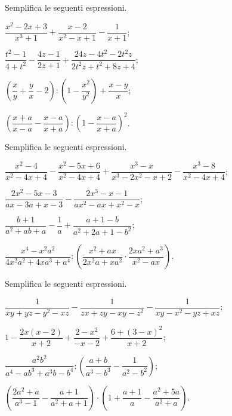 \begin{esercizio}[\Ast]
Semplifica le seguenti espressioni.
\begin{multicols}{2}
\begin{enumeratea}
 \item $\dfrac{x^{{2}}-2x+3}{x^{{3}}+1}+\dfrac{x-2}{x^{{2}}-x+1}-\dfrac{1}{x+1}$;
 \item $\dfrac{t^{2}-1}{4+t^{2}}-\dfrac{4z-1}{2z+1}+\dfrac{24z-4t^{2}-2t^{2}z}{2t^{2}z+t^{2}+8z+4}$;
 \item $\left(\dfrac{x}{y}+\dfrac{y}{x}-2\right):\left(1-\dfrac{x^{2}}{y^{2}}\right)+\dfrac{x-y}{x}$;
 \item $\left(\dfrac{x+a}{x-a}-\dfrac{x-a}{x+a}\right):\left(1-\dfrac{x-a}{x+a}\right)^{2}$.
\end{enumeratea}
\end{multicols}
\end{esercizio}

\begin{esercizio}
Semplifica le seguenti espressioni.
\begin{enumeratea}
 \item $\dfrac{x^{2}-4}{x^{2}-4x+4}-\dfrac{x^{2}-5x+6}{x^{2}-4x+4}+\dfrac{x^{3}-x}{x^{3}-2x^{2}-x+2}-\dfrac{x^{3}-8}{x^{2}-4x+4}$;
 \item $\dfrac{2x^{2}-5x-3}{ax-3a+x-3}-\dfrac{2x^{3}-x-1}{ax^{2}-ax+x^{2}-x}$;
 \item $\dfrac{b+1}{a^{2}+ab+a}-\dfrac{1}{a}+\dfrac{a+1-b}{a^{2}+2a+1-b^{2}}$;
 \item $\dfrac{x^{4}-x^{2}a^{2}}{4x^{2}a^{2}+4xa^{3}+a^{4}}:\left(\dfrac{x^{2}+ax}{2x^{2}a+xa^{2}}\cdot{\dfrac{2xa^{2}+a^{3}}{x^{2}-ax}}\right)$.
\end{enumeratea}
\end{esercizio}

\begin{esercizio}[\Ast]
Semplifica le seguenti espressioni.
\begin{enumeratea}
 \item $\dfrac{1}{xy+yz-y^{2}-xz}-\dfrac{1}{zx+zy-xy-z^{2}}-\dfrac{1}{xy-x^{2}-yz+xz}$;
 \item $1-\dfrac{2x(x-2)}{x+2}+\dfrac{2-x^{2}}{-x-2}+\dfrac{6+(3-x)^{2}}{x+2}$;
 \item $\dfrac{a^{2}b^{2}}{a^{4}-ab^{3}+a^{3}b-b^{4}}:\left(\dfrac{a+b}{a^{3}-b^{3}}-\dfrac{1}{a^{2}-b^{2}}\right)$;
 \item $\left(\dfrac{2a^{2}+a}{a^{3}-1}-\dfrac{a+1}{a^{2}+a+1}\right)\cdot \left(1+\dfrac{a+1}{a}-\dfrac{a^{2}+5a}{a^{2}+a}\right)$.
\end{enumeratea}
\end{esercizio}

